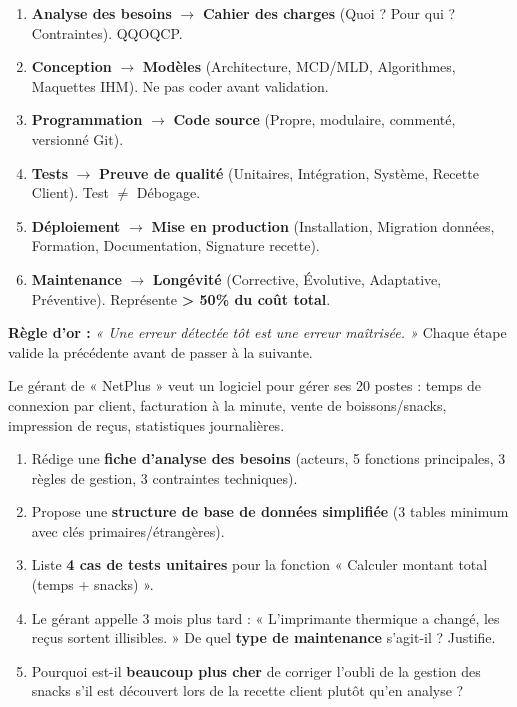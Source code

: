\documentclass[11pt]{article}
\newcommand{\cle}[1]{{\popxbold\color{popdark}#1}}
\begin{document}
\begin{aretenir}
\begin{enumerate}
    \item \textbf{Analyse des besoins} $\rightarrow$ \textbf{Cahier des charges} (Quoi ? Pour qui ? Contraintes). \cle{QQOQCP}.
    \item \textbf{Conception} $\rightarrow$ \textbf{Modèles} (Architecture, MCD/MLD, Algorithmes, Maquettes IHM). Ne pas coder avant validation.
    \item \textbf{Programmation} $\rightarrow$ \textbf{Code source} (Propre, modulaire, commenté, versionné Git).
    \item \textbf{Tests} $\rightarrow$ \textbf{Preuve de qualité} (Unitaires, Intégration, Système, Recette Client). Test $\neq$ Débogage.
    \item \textbf{Déploiement} $\rightarrow$ \textbf{Mise en production} (Installation, Migration données, Formation, Documentation, Signature recette).
    \item \textbf{Maintenance} $\rightarrow$ \textbf{Longévité} (Corrective, Évolutive, Adaptative, Préventive). Représente \textbf{> 50\% du coût total}.
\end{enumerate}
\textbf{Règle d'or :} \emph{« Une erreur détectée tôt est une erreur maîtrisée. »} Chaque étape valide la précédente avant de passer à la suivante.
\end{aretenir}

\begin{exercice}
Le gérant de « NetPlus » veut un logiciel pour gérer ses 20 postes : temps de connexion par client, facturation à la minute, vente de boissons/snacks, impression de reçus, statistiques journalières.
\begin{enumerate}
    \item Rédige une \textbf{fiche d'analyse des besoins} (acteurs, 5 fonctions principales, 3 règles de gestion, 3 contraintes techniques).
    \item Propose une \textbf{structure de base de données simplifiée} (3 tables minimum avec clés primaires/étrangères).
    \item Liste \textbf{4 cas de tests unitaires} pour la fonction « Calculer montant total (temps + snacks) ».
    \item Le gérant appelle 3 mois plus tard : « L'imprimante thermique a changé, les reçus sortent illisibles. » De quel \textbf{type de maintenance} s'agit-il ? Justifie.
    \item Pourquoi est-il \textbf{beaucoup plus cher} de corriger l'oubli de la gestion des snacks s'il est découvert lors de la recette client plutôt qu'en analyse ?
\end{enumerate}
\end{exercice}
\end{document}
